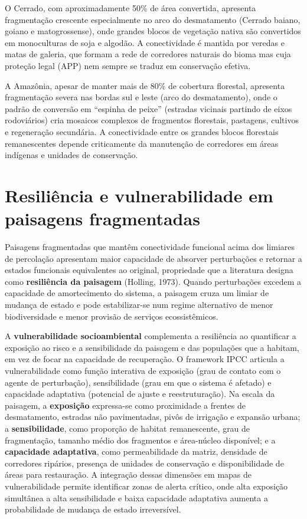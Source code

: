 \documentclass[
  portuguese,
  11pt,
  a4paper,
  open=any]{scrbook}
\begin{document}
O Cerrado, com aproximadamente 50\% de área convertida, apresenta
fragmentação crescente especialmente no arco do desmatamento (Cerrado
baiano, goiano e matogrossense), onde grandes blocos de vegetação nativa
são convertidos em monoculturas de soja e algodão. A conectividade é
mantida por veredas e matas de galeria, que formam a rede de corredores
naturais do bioma mas cuja proteção legal (APP) nem sempre se traduz em
conservação efetiva.

A Amazônia, apesar de manter mais de 80\% de cobertura florestal,
apresenta fragmentação severa nas bordas sul e leste (arco do
desmatamento), onde o padrão de conversão em ``espinha de peixe''
(estradas vicinais partindo de eixos rodoviários) cria mosaicos
complexos de fragmentos florestais, pastagens, cultivos e regeneração
secundária. A conectividade entre os grandes blocos florestais
remanescentes depende criticamente da manutenção de corredores em áreas
indígenas e unidades de conservação.

\section{Resiliência e vulnerabilidade em paisagens
fragmentadas}\label{sec-resiliencia-paisagem}

Paisagens fragmentadas que mantêm conectividade funcional acima dos
limiares de percolação apresentam maior capacidade de absorver
perturbações e retornar a estados funcionais equivalentes ao original,
propriedade que a literatura designa como \textbf{resiliência da
paisagem} (Holling, 1973). Quando perturbações excedem a capacidade de
amortecimento do sistema, a paisagem cruza um limiar de mudança de
estado e pode estabilizar-se num regime alternativo de menor
biodiversidade e menor provisão de serviços ecossistêmicos.

A \textbf{vulnerabilidade socioambiental} complementa a resiliência ao
quantificar a exposição ao risco e a sensibilidade da paisagem e das
populações que a habitam, em vez de focar na capacidade de recuperação.
O framework IPCC articula a vulnerabilidade como função interativa de
exposição (grau de contato com o agente de perturbação), sensibilidade
(grau em que o sistema é afetado) e capacidade adaptativa (potencial de
ajuste e reestruturação). Na escala da paisagem, a \textbf{exposição}
expressa-se como proximidade a frentes de desmatamento, estradas não
pavimentadas, pivôs de irrigação e expansão urbana; a
\textbf{sensibilidade}, como proporção de habitat remanescente, grau de
fragmentação, tamanho médio dos fragmentos e área-núcleo disponível; e a
\textbf{capacidade adaptativa}, como permeabilidade da matriz, densidade
de corredores ripários, presença de unidades de conservação e
disponibilidade de áreas para restauração. A integração dessas dimensões
em mapas de vulnerabilidade permite identificar zonas de alerta crítico,
onde alta exposição simultânea a alta sensibilidade e baixa capacidade
adaptativa aumenta a probabilidade de mudança de estado irreversível.
\end{document}
